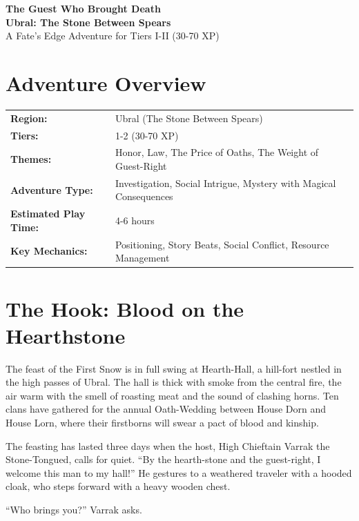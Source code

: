 \documentclass[11pt]{article}
\begin{document}


\begin{center}
    \textbf{\LARGE The Guest Who Brought Death} \\
    \vspace{0.2cm}
    \textbf{Ubral: The Stone Between Spears} \\
    \vspace{0.1cm}
    \small A Fate's Edge Adventure for Tiers I-II (30-70 XP)
\end{center}

\section*{Adventure Overview}
\begin{longtable}{@{}ll}
    \textbf{Region:} & Ubral (The Stone Between Spears) \\
    \textbf{Tiers:} & 1-2 (30-70 XP) \\
    \textbf{Themes:} & Honor, Law, The Price of Oaths, The Weight of Guest-Right \\
    \textbf{Adventure Type:} & Investigation, Social Intrigue, Mystery with Magical Consequences \\
    \textbf{Estimated Play Time:} & 4-6 hours \\
    \textbf{Key Mechanics:} & Positioning, Story Beats, Social Conflict, Resource Management \\
\end{longtable}

\section*{The Hook: Blood on the Hearthstone}
The feast of the First Snow is in full swing at Hearth-Hall, a hill-fort nestled in the high passes of Ubral. The hall is thick with smoke from the central fire, the air warm with the smell of roasting meat and the sound of clashing horns. Ten clans have gathered for the annual Oath-Wedding between House Dorn and House Lorn, where their firstborns will swear a pact of blood and kinship.

The feasting has lasted three days when the host, High Chieftain Varrak the Stone-Tongued, calls for quiet. ``By the hearth-stone and the guest-right, I welcome this man to my hall!'' He gestures to a weathered traveler with a hooded cloak, who steps forward with a heavy wooden chest.

``Who brings you?'' Varrak asks.
\end{document}
